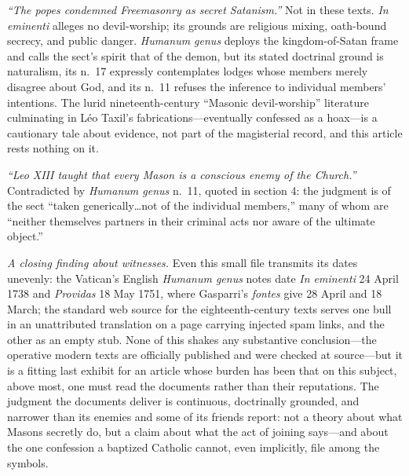 \emph{``The popes condemned Freemasonry as secret Satanism.''} Not in these texts. \emph{In eminenti} alleges no devil-worship; its grounds are religious mixing, oath-bound secrecy, and public danger. \emph{Humanum genus} deploys the kingdom-of-Satan frame and calls the sect's spirit that of the demon, but its stated doctrinal ground is naturalism, its n.~17 expressly contemplates lodges whose members merely disagree about God, and its n.~11 refuses the inference to individual members' intentions. The lurid nineteenth-century ``Masonic devil-worship'' literature culminating in L\'eo Taxil's fabrications---eventually confessed as a hoax---is a cautionary tale about evidence, not part of the magisterial record, and this article rests nothing on it.

\emph{``Leo XIII taught that every Mason is a conscious enemy of the Church.''} Contradicted by \emph{Humanum genus} n.~11, quoted in section 4: the judgment is of the sect ``taken generically\ldots not of the individual members,'' many of whom are ``neither themselves partners in their criminal acts nor aware of the ultimate object.''

\emph{A closing finding about witnesses.} Even this small file transmits its dates unevenly: the Vatican's English \emph{Humanum genus} notes date \emph{In eminenti} 24 April 1738 and \emph{Providas} 18 May 1751, where Gasparri's \emph{fontes} give 28 April and 18 March; the standard web source for the eighteenth-century texts serves one bull in an unattributed translation on a page carrying injected spam links, and the other as an empty stub. None of this shakes any substantive conclusion---the operative modern texts are officially published and were checked at source---but it is a fitting last exhibit for an article whose burden has been that on this subject, above most, one must read the documents rather than their reputations. The judgment the documents deliver is continuous, doctrinally grounded, and narrower than its enemies and some of its friends report: not a theory about what Masons secretly do, but a claim about what the act of joining says---and about the one confession a baptized Catholic cannot, even implicitly, file among the symbols.
